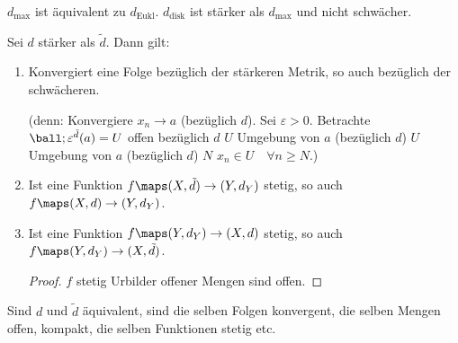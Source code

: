 \begin{beispiel*}
    \( d_{\max} \) ist äquivalent zu \( d_{\text{Eukl}} \). \( d_{\text{disk}} \) ist stärker als \( d_{\max}  \) und nicht schwächer.
\end{beispiel*}
\begin{bemerkungen}
    Sei \( d \) stärker als \( \tilde{d} \). Dann gilt:
    \begin{enumerate}
        \item Konvergiert eine Folge bezüglich der stärkeren Metrik, so auch bezüglich der schwächeren.
        
        (denn: Konvergiere \( x_n\to a \) (bezüglich \( d \)). Sei \( \varepsilon>0 \). Betrachte \( \ball;{\varepsilon}^{\tilde{d}}(a)=U \) offen bezüglich \( d \) \timplies \( U \) Umgebung von \( a \) (bezüglich \( d \)) \timplies \( U \) Umgebung von \( a \) (bezüglich \( d \)) \timplies \texists  \( N \) \sd \( x_n\in U\quad \forall n\geq N \).)
        
        \item Ist eine Funktion \( f\maps (X,\tilde{d})\to (Y,d_Y) \) stetig, so auch \( f\maps (X,d)\to (Y,d_Y) \).
        \item Ist eine Funktion \( f\maps (Y,d_Y)\to (X,d) \) stetig, so auch \( f\maps (Y,d_Y)\to (X,\tilde{d}) \).
        
        \begin{proof}
            \( f \) stetig \tiff Urbilder offener Mengen sind offen.
            
        \end{proof}
        
    \end{enumerate}
\end{bemerkungen}
\begin{bemerkung*}
    Sind \( d \) und \( \tilde{d} \) äquivalent, sind die selben Folgen konvergent, die selben Mengen offen, kompakt, die selben Funktionen stetig etc.
\end{bemerkung*}
